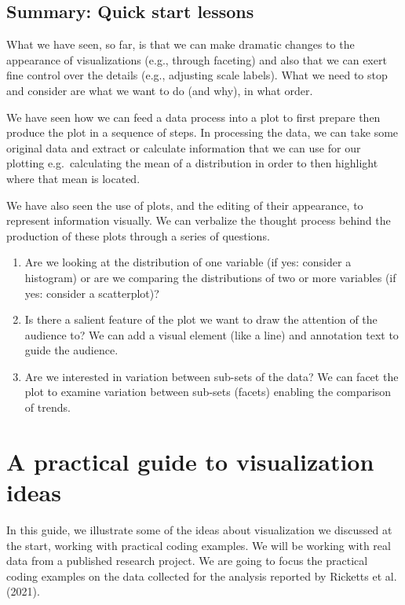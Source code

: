 \documentclass[
  letterpaper,
  DIV=11,
  numbers=noendperiod]{scrreprt}
\providecommand{\tightlist}{%
  \setlength{\itemsep}{0pt}\setlength{\parskip}{0pt}}\usepackage{longtable,booktabs,array}
\begin{document}
\hypertarget{summary-quick-start-lessons}{%
\subsection{Summary: Quick start
lessons}\label{summary-quick-start-lessons}}

What we have seen, so far, is that we can make dramatic changes to the
appearance of visualizations (e.g., through faceting) and also that we
can exert fine control over the details (e.g., adjusting scale labels).
What we need to stop and consider are what we want to do (and why), in
what order.

We have seen how we can feed a data process into a plot to first prepare
then produce the plot in a sequence of steps. In processing the data, we
can take some original data and extract or calculate information that we
can use for our plotting e.g.~calculating the mean of a distribution in
order to then highlight where that mean is located.

We have also seen the use of plots, and the editing of their appearance,
to represent information visually. We can verbalize the thought process
behind the production of these plots through a series of questions.

\begin{enumerate}
\def\labelenumi{\arabic{enumi}.}
\tightlist
\item
  Are we looking at the distribution of one variable (if yes: consider a
  histogram) or are we comparing the distributions of two or more
  variables (if yes: consider a scatterplot)?
\item
  Is there a salient feature of the plot we want to draw the attention
  of the audience to? We can add a visual element (like a line) and
  annotation text to guide the audience.
\item
  Are we interested in variation between sub-sets of the data? We can
  facet the plot to examine variation between sub-sets (facets) enabling
  the comparison of trends.
\end{enumerate}

\hypertarget{sec-practical-visualization}{%
\section{A practical guide to visualization
ideas}\label{sec-practical-visualization}}

In this guide, we illustrate some of the ideas about visualization we
discussed at the start, working with practical coding examples. We will
be working with real data from a published research project. We are
going to focus the practical coding examples on the data collected for
the analysis reported by Ricketts et al. (2021).
\end{document}
